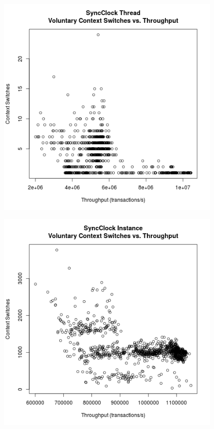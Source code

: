 \begin{figure}
\center
\includegraphics[height=.4\textheight]{sync_thread_throughput_context.png}
\caption{\label{sync_thread_throughput_context}}
\end{figure}

\begin{figure}
\center
\includegraphics[height=.4\textheight]{sync_instance_throughput_context.png}
\caption{\label{sync_instance_throughput_context}}
\end{figure}

